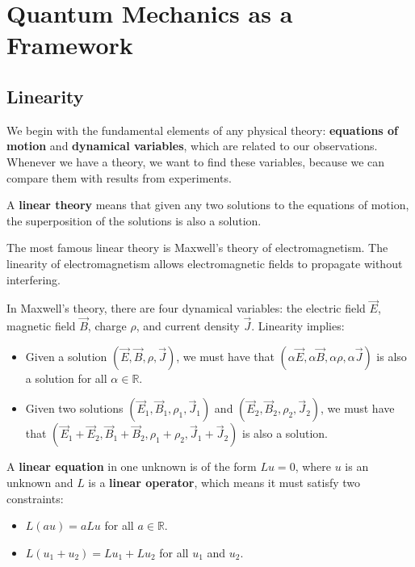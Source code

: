 \section{Quantum Mechanics as a Framework}
\label{quantum_framework}
    \subsection{Linearity}
    \label{linearity}

    We begin with the fundamental elements of any physical theory: \textbf{equations of motion} and \textbf{dynamical variables}, which are related to our observations. Whenever we have a theory, we want to find these variables, because we can compare them with results from experiments.

    A \textbf{linear theory} means that given any two solutions to the equations of motion, the superposition of the solutions is also a solution.

    \begin{framedexpl} [Electromagnetism]
       The most famous linear theory is Maxwell's theory of electromagnetism. The linearity of electromagnetism allows electromagnetic fields to propagate without interfering. 
    \end{framedexpl}
    
    In Maxwell's theory, there are four dynamical variables: the electric field $\vec{E}$, magnetic field $\vec{B}$, charge $\rho$, and current density $\vec{J}$. Linearity implies:
    \begin{itemize}
    \item Given a solution $(\vec{E},\vec{B},\rho,\vec{J})$, we must have that $(\alpha\vec{E},\alpha\vec{B},\alpha\rho,\alpha\vec{J})$ is also a solution for all $\alpha\in\mathbb{R}$.
    \item Given two solutions $(\vec{E}_1,\vec{B}_1,\rho_1,\vec{J}_1)$ and $(\vec{E}_2,\vec{B}_2,\rho_2,\vec{J}_2)$, we must have that $(\vec{E}_1+\vec{E}_2,\vec{B}_1+\vec{B}_2,\rho_1+\rho_2,\vec{J}_1+\vec{J}_2)$ is also a solution.
    \end{itemize}
    
    A \textbf{linear equation} in one unknown is of the form $Lu=0$, where $u$ is an unknown and $L$ is a \textbf{linear operator}, which means it must satisfy two constraints:
    \begin{itemize}
        \item $L(au)=aLu$ for all $a\in\mathbb{R}$.
        \item $L(u_1+u_2)=Lu_1+Lu_2$ for all $u_1$ and $u_2$.
    \end{itemize}
    
